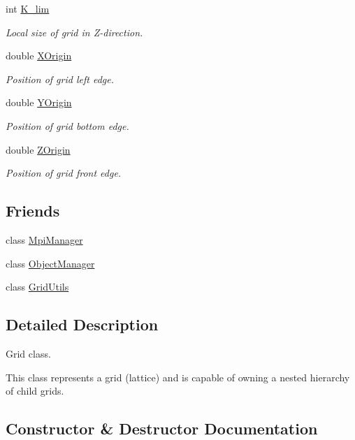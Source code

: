 \begin{DoxyCompactItemize}
int \hyperlink{class_grid_obj_aaccc404f2fbdbaef8c5dd134f7d9e17f}{K\+\_\+lim}
\begin{DoxyCompactList}\small\item\em Local size of grid in Z-\/direction. \end{DoxyCompactList}\item 
double \hyperlink{class_grid_obj_adcd2bcbd5bb4009d7c84097e1356a1fa}{X\+Origin}
\begin{DoxyCompactList}\small\item\em Position of grid left edge. \end{DoxyCompactList}\item 
double \hyperlink{class_grid_obj_a30c070fe26def1366db2b3e66b3cd29d}{Y\+Origin}
\begin{DoxyCompactList}\small\item\em Position of grid bottom edge. \end{DoxyCompactList}\item 
double \hyperlink{class_grid_obj_a69d43fd31ba7edd4fc9f02eb0c0fcefd}{Z\+Origin}
\begin{DoxyCompactList}\small\item\em Position of grid front edge. \end{DoxyCompactList}\end{DoxyCompactItemize}
\subsection*{Friends}
\begin{DoxyCompactItemize}
\item 
class \hyperlink{class_grid_obj_a831466b4226dde3791b04756e4cfa6fc}{Mpi\+Manager}
\item 
class \hyperlink{class_grid_obj_a8b86bdcdb7c54a536293d8632363e114}{Object\+Manager}
\item 
class \hyperlink{class_grid_obj_a8891d532b9568ad83535721b0e6b79c9}{Grid\+Utils}
\end{DoxyCompactItemize}


\subsection{Detailed Description}
Grid class. 

This class represents a grid (lattice) and is capable of owning a nested hierarchy of child grids. 

\subsection{Constructor \& Destructor Documentation}
